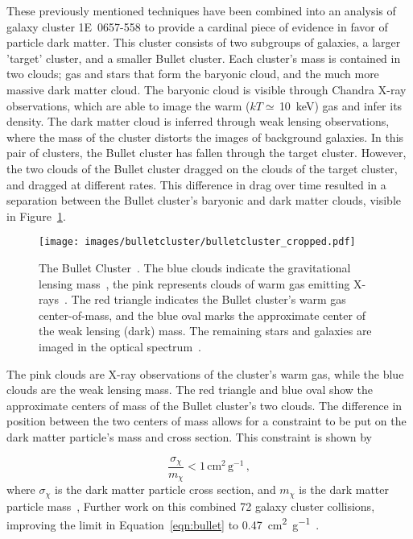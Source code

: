 These previously mentioned techniques have been combined into an analysis of galaxy cluster \mbox{1E 0657-558} to provide a cardinal piece of evidence in favor of particle dark matter.
This cluster consists of two subgroups of galaxies, a larger 'target' cluster, and a smaller Bullet cluster.
Each cluster's mass is contained in two clouds; gas and stars that form the baryonic cloud, and the much more massive dark matter cloud.
The baryonic cloud is visible through Chandra X-ray observations, which are able to image the warm ($kT\simeq\,$\SI{10}{keV}) gas and infer its density.
The dark matter cloud is inferred through weak lensing observations, where the mass of the cluster distorts the images of background galaxies.
In this pair of clusters, the Bullet cluster has fallen through the target cluster.
However, the two clouds of the Bullet cluster dragged on the clouds of the target cluster, and dragged at different rates.
This difference in drag over time resulted in a separation between the Bullet cluster's baryonic and dark matter clouds, visible in Figure~\ref{fig:bullet}.

\begin{figure}[!ht]
  \centering
  \texttt{[image: images/bulletcluster/bulletcluster\_cropped.pdf]}
  \caption[The Bullet Cluster]{
    The Bullet Cluster~\cite{bullet_cluster_combined_image}.
    The blue clouds indicate the gravitational lensing mass~\cite{bullet_cluster}, the pink represents clouds of warm gas emitting X-rays~\cite{bullet_cluster_chandramap}.
    The red triangle indicates the Bullet cluster's warm gas center-of-mass, and the blue oval marks the approximate center of the weak lensing (dark) mass.
    The remaining stars and galaxies are imaged in the optical spectrum~\cite{bullet_cluster_composite}.}
  \label{fig:bullet}
\end{figure}
    
The pink clouds are X-ray observations of the cluster's warm gas, while the blue clouds are the weak lensing mass.
The red triangle and blue oval show the approximate centers of mass of the Bullet cluster's two clouds.
The difference in position between the two centers of mass allows for a constraint to be put on the dark matter particle's mass and cross section.
This constraint is shown by

\begin{equation}\label{eqn:bullet}
  \frac{\sigma_{\chi}}{m_{\chi}} < 1 \, \textrm{cm}^2 \, \textrm{g}^{-1} \,,
\end{equation}
where $\sigma_{\chi}$ is the dark matter particle cross section, and $m_{\chi}$ is the dark matter particle mass~\cite{bullet_cluster,bullet_cluster2},
Further work on this combined 72 galaxy cluster collisions, improving the limit in Equation~\ref{eqn:bullet} to \SI{0.47}{cm^2 g^{-1}}~\cite{cluster_72}.


